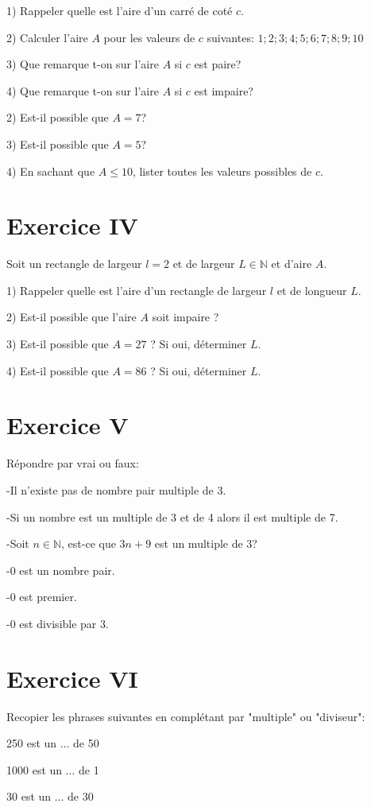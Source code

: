 \documentclass[french]{article}
\begin{document}
1) Rappeler quelle est l'aire d'un carré de coté $c$.

2) Calculer l'aire $A$ pour les valeurs de $c$ suivantes: $1; 2; 3; 4; 5; 6; 7; 8; 9; 10$

3) Que remarque t-on sur l'aire $A$ si $c$ est paire?

4) Que remarque t-on sur l'aire $A$ si $c$ est impaire?

2) Est-il possible que $A=7$?

3) Est-il possible que $A=5$?

4) En sachant que $A\leq 10$, lister toutes les valeurs possibles de $c$.

\section*{Exercice IV}

Soit un rectangle de largeur $l=2$ et de largeur $L \in \mathbb{N}$ et d'aire $A$.

1) Rappeler quelle est l'aire d'un rectangle de largeur $l$ et de longueur $L$.

2) Est-il possible que l'aire $A$ soit impaire ?

3) Est-il possible que $A=27$ ? Si oui, déterminer $L$.

4) Est-il possible que $A=86$ ? Si oui, déterminer $L$.
 

\section*{Exercice V}
Répondre par vrai ou faux:

-Il n'existe pas de nombre pair multiple de 3.

-Si un nombre est un multiple de 3 et de 4 alors il est multiple de 7.

-Soit $n\in \mathbb{N}$, est-ce que $3n+9$ est un multiple de 3?  

-0 est un nombre pair.

-0 est premier.

-0 est divisible par 3.


\section*{Exercice VI}
Recopier les phrases suivantes en complétant par "multiple" ou "diviseur":

250 est un ... de 50

1000 est un ... de 1

30 est un ... de 30
\end{document}
